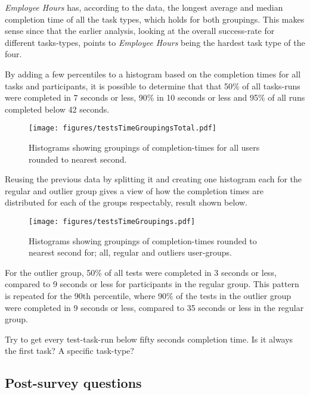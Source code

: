    \textit{Employee Hours} has, according to the data, the longest average
    and median completion time of all the task types, which holds for both
    groupings. This makes sense since that the earlier analysis, looking at
    the overall success-rate for different tasks-types, points to
    \textit{Employee Hours} being the hardest task type of the four.

    By adding a few percentiles to a histogram based on the completion times for all
    tasks and participants, it is possible to determine that that 50\% of
    all tasks-runs were completed in 7 seconds or less, 90\% in 10 seconds
    or less and 95\% of all runs completed below 42 seconds.

    \begin{figure}[h!]
      \centering
      \texttt{[image: figures/testsTimeGroupingsTotal.pdf]}
      \caption{
        Histograms showing groupings of completion-times for all users
        rounded to nearest second.
      }
    \end{figure}


    Reusing the previous data by splitting it and creating one histogram
    each for the regular and outlier group gives a view of how the completion
    times are distributed for each of the groups respectably, result shown
    below.

    \begin{figure}[h!]
      \centering
      \texttt{[image: figures/testsTimeGroupings.pdf]}
      \caption{
        Histograms showing groupings of completion-times rounded to nearest
        second for; all, regular and outliers user-groups.
      }
    \end{figure}

    For the outlier group, 50\% of all tests were completed in 3 seconds or
    less, compared to 9 seconds or less for participants in the regular
    group. This pattern is repeated for the 90th percentile, where 90\% of
    the tests in the outlier group were completed in 9 seconds or less,
    compared to 35 seconds or less in the regular group.

		\iterchange
		Try to get every test-task-run below fifty seconds completion time. Is it
		always the first task? A specific task-type?

  \subsection{Post-survey questions}

